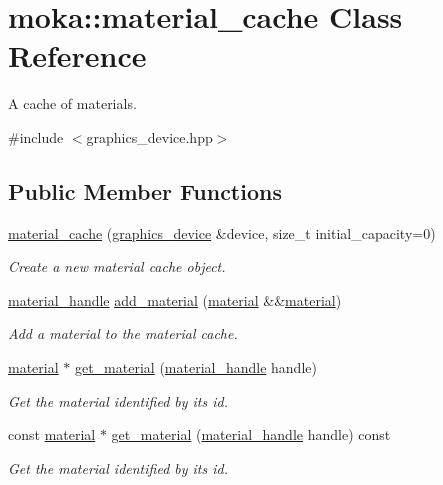 \hypertarget{classmoka_1_1material__cache}{}\section{moka\+::material\+\_\+cache Class Reference}
\label{classmoka_1_1material__cache}


A cache of materials.  




{\ttfamily \#include $<$graphics\+\_\+device.\+hpp$>$}

\subsection*{Public Member Functions}
\begin{DoxyCompactItemize}
\item 
\mbox{\hyperlink{classmoka_1_1material__cache_a0cf9e1de19ab63480f689da817466dae}{material\+\_\+cache}} (\mbox{\hyperlink{classmoka_1_1graphics__device}{graphics\+\_\+device}} \&device, size\+\_\+t initial\+\_\+capacity=0)
\begin{DoxyCompactList}\small\item\em Create a new material cache object. \end{DoxyCompactList}\item 
\mbox{\hyperlink{structmoka_1_1material__handle}{material\+\_\+handle}} \mbox{\hyperlink{classmoka_1_1material__cache_a9ddd120e506cfaaa3386f5e2e9c031b3}{add\+\_\+material}} (\mbox{\hyperlink{classmoka_1_1material}{material}} \&\&\mbox{\hyperlink{classmoka_1_1material}{material}})
\begin{DoxyCompactList}\small\item\em Add a material to the material cache. \end{DoxyCompactList}\item 
\mbox{\hyperlink{classmoka_1_1material}{material}} $\ast$ \mbox{\hyperlink{classmoka_1_1material__cache_a061b66b048cb75daf59cf0238119c6e9}{get\+\_\+material}} (\mbox{\hyperlink{structmoka_1_1material__handle}{material\+\_\+handle}} handle)
\begin{DoxyCompactList}\small\item\em Get the material identified by its id. \end{DoxyCompactList}\item 
const \mbox{\hyperlink{classmoka_1_1material}{material}} $\ast$ \mbox{\hyperlink{classmoka_1_1material__cache_a7d913ebcd23f10e53620790e383f60c2}{get\+\_\+material}} (\mbox{\hyperlink{structmoka_1_1material__handle}{material\+\_\+handle}} handle) const
\begin{DoxyCompactList}\small\item\em Get the material identified by its id. \end{DoxyCompactList}\end{DoxyCompactItemize}


